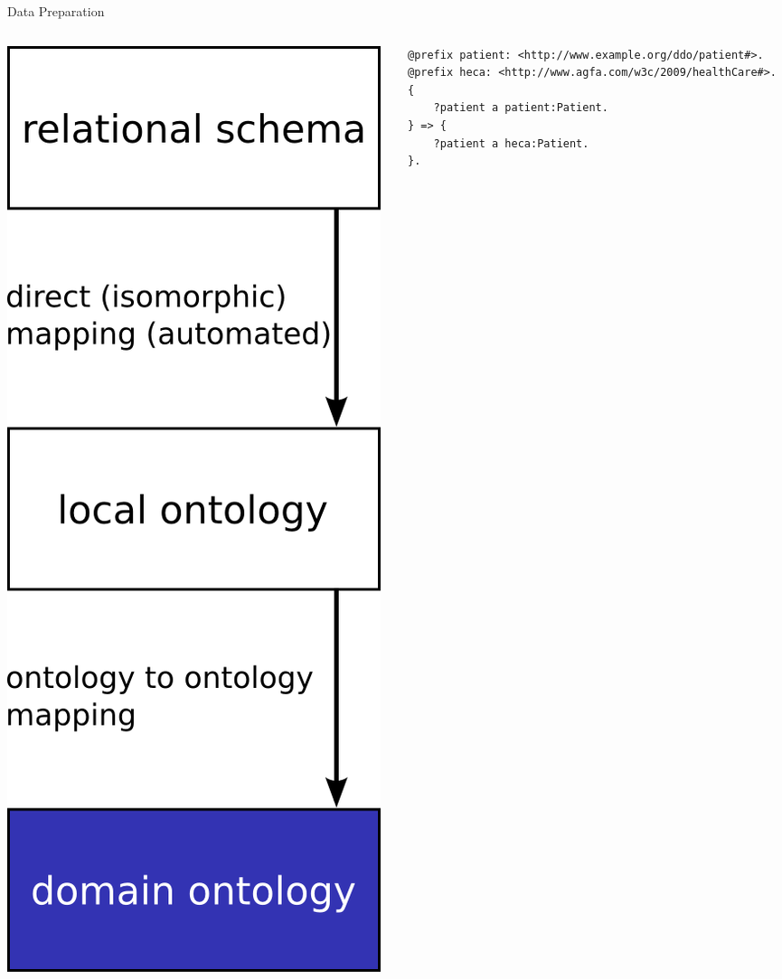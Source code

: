 \message{ !name(presentation.tex)}\documentclass{beamer}
\begin{document}
\begin{frame}[fragile]{Data Preparation}
\begin{columns}
\begin{column}{.3\textwidth}
\includegraphics[width=\textwidth,height=.88\textheight,keepaspectratio]{g3}
\end{column}%
\hfill%
\begin{column}{.66\textwidth}
{\tiny
\begin{verbatim}
@prefix patient: <http://www.example.org/ddo/patient#>.
@prefix heca: <http://www.agfa.com/w3c/2009/healthCare#>.
{
    ?patient a patient:Patient.
} => {
    ?patient a heca:Patient.
}.


\end{verbatim}}
\end{column}
\end{columns}
\end{frame}
\end{document}
